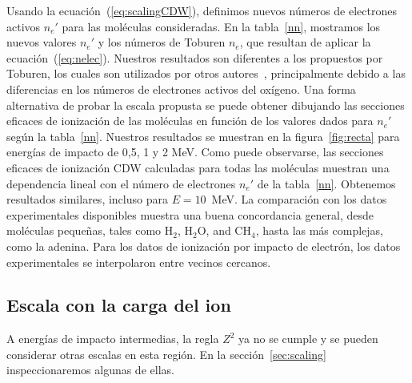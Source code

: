 Usando la ecuación~(\ref{eq:scalingCDW}), definimos nuevos números de 
electrones activos $n_e'$ para las moléculas consideradas. En la 
tabla~\ref{nn}, mostramos los nuevos valores $n_e'$ y los números de 
Toburen $n_e$, que resultan de aplicar la ecuación~(\ref{eq:nelec}). 
Nuestros resultados son diferentes a los propuestos por Toburen, los 
cuales son utilizados por otros autores~\cite{itoh2013}, principalmente 
debido a las diferencias en los números de electrones activos del 
oxígeno. Una forma alternativa de probar la escala propusta se puede
obtener dibujando las secciones eficaces de ionización de las moléculas 
en función de los valores dados para $n_e'$ según la tabla~\ref{nn}. 
Nuestros resultados se muestran en la figura~\ref{fig:recta} para 
energías de impacto de 0,5, 1 y 2 MeV. Como puede observarse, las 
secciones eficaces de ionización CDW calculadas para todas las moléculas 
muestran una dependencia lineal con el número de electrones $n_e'$ de 
la tabla~\ref{nn}. Obtenemos resultados similares, incluso para 
$E=10$~MeV. La comparación con los datos experimentales disponibles 
muestra una buena concordancia general, desde moléculas pequeñas, tales
como H$_2$, H$_2$O, and CH$_4$, hasta las más complejas, como la adenina. 
Para los datos de ionización por impacto de electrón, los datos 
experimentales se interpolaron entre vecinos cercanos. 


\subsection{Escala con la carga del ion}
\label{sec:zscaling}

A energías de impacto intermedias, la regla $Z^2$ ya no se cumple y se 
pueden considerar otras escalas en esta región. En la 
sección~\ref{sec:scaling} inspeccionaremos algunas de ellas.

